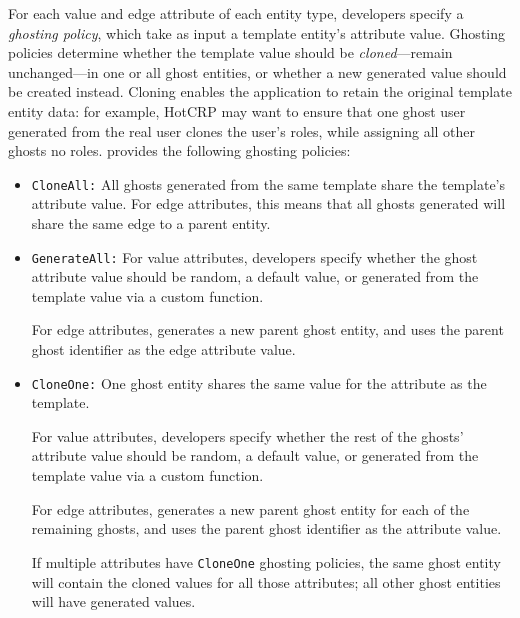 For each value and edge attribute of each entity type, developers specify a \emph{ghosting policy},
which take as input a template entity's attribute value.  Ghosting policies determine whether the
template value should be \emph{cloned}---remain unchanged---in one or all ghost entities, or whether
a new generated value should be created instead. Cloning enables the application to retain
the original template entity data: for example, HotCRP may want to ensure that one ghost user
generated from the real user clones the user's roles, while assigning all other ghosts no roles.
\sys provides the following ghosting policies:
\begin{itemize}
    \item \texttt{CloneAll:} All ghosts generated from the same template share the template's 
        attribute value. For edge attributes, this means that all ghosts generated will share the
        same edge to a parent entity.

    \item \texttt{GenerateAll:} 
        For value attributes, developers specify whether the ghost attribute value should be
        random, a default value, or generated from the template value via a custom function.
        
        For edge attributes, \sys generates a new parent ghost entity, and uses the parent ghost
        identifier as the edge attribute value.

    \item \texttt{CloneOne:} One ghost entity shares the same value for the attribute as the
        template. 
        
        For value attributes, developers specify whether the rest of the ghosts' attribute value should be
        random, a default value, or generated from the template value via a custom function.

        For edge attributes, \sys generates a new parent ghost entity for each of the remaining
        ghosts, and uses the parent ghost identifier as the attribute value.

        If multiple attributes have \texttt{CloneOne} ghosting policies, the same ghost entity will
        contain the cloned values for all those attributes; all other ghost entities will have
        generated values.
\end{itemize}


%


